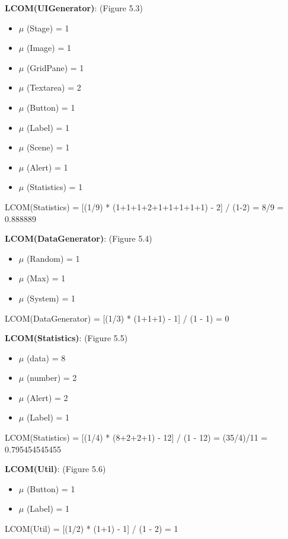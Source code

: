 \documentclass[12pt,letterpaper]{report}
\begin{document}
 \bigskip
 \textbf{LCOM(UIGenerator)}: (Figure 5.3) 
    \begin{itemize}
        \item \(\mu\) (Stage) = 1
        \item \(\mu\) (Image) = 1
        \item \(\mu\) (GridPane) = 1
        \item \(\mu\) (Textarea) = 2
        \item \(\mu\) (Button) = 1
        \item \(\mu\) (Label) = 1
        \item \(\mu\) (Scene) = 1
        \item \(\mu\) (Alert) = 1
        \item \(\mu\) (Statistics) = 1
    \end{itemize} 
    \vspace{5mm} \hspace{7mm} 
    LCOM(Statistics) = [(1/9) * (1+1+1+2+1+1+1+1+1) - 2] / (1-2) = 8/9 = 0.888889
    \space

 \bigskip
 \textbf{LCOM(DataGenerator)}: (Figure 5.4) 
    \begin{itemize}
        \item \(\mu\) (Random) = 1
        \item \(\mu\) (Max) = 1
        \item \(\mu\) (System) = 1
    \end{itemize} 
    \vspace{5mm} \hspace{7mm} 
    LCOM(DataGenerator) = [(1/3) * (1+1+1) - 1] / (1 - 1) = 0    
    \space


 \bigskip
 \textbf{LCOM(Statistics)}: (Figure 5.5) 
    \begin{itemize}
        \item \(\mu\) (data) = 8
        \item \(\mu\) (number) = 2
        \item \(\mu\) (Alert) = 2
        \item \(\mu\) (Label) = 1
    \end{itemize} 
    \vspace{5mm} \hspace{7mm} 
    LCOM(Statistics) = [(1/4) * (8+2+2+1) - 12] / (1 - 12) = (35/4)/11 = 0.795454545455
    \space


 \bigskip
 \textbf{LCOM(Util)}: (Figure 5.6) 
    \begin{itemize}
        \item \(\mu\) (Button) = 1
        \item \(\mu\) (Label) = 1
    \end{itemize} 
    \vspace{5mm} \hspace{7mm} 
    LCOM(Util) = [(1/2) * (1+1) - 1] / (1 - 2) = 1
    \space
\end{document}
